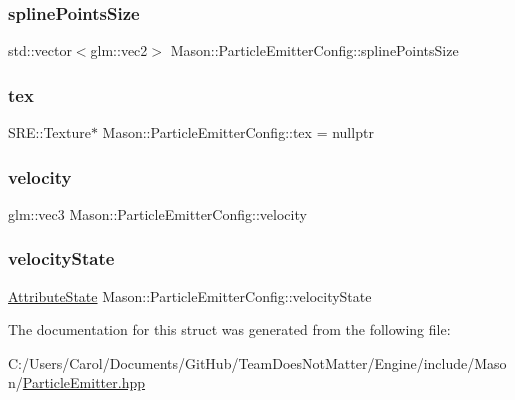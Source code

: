 \subsubsection{\texorpdfstring{spline\+Points\+Size}{splinePointsSize}}
{\footnotesize\ttfamily std\+::vector$<$glm\+::vec2$>$ Mason\+::\+Particle\+Emitter\+Config\+::spline\+Points\+Size}

\hypertarget{struct_mason_1_1_particle_emitter_config_a660e9a7613b158ac36bfc4ffe8b5f610}{}\label{struct_mason_1_1_particle_emitter_config_a660e9a7613b158ac36bfc4ffe8b5f610} 
\subsubsection{\texorpdfstring{tex}{tex}}
{\footnotesize\ttfamily S\+R\+E\+::\+Texture$\ast$ Mason\+::\+Particle\+Emitter\+Config\+::tex = nullptr}

\hypertarget{struct_mason_1_1_particle_emitter_config_af8c3efa305e0a0636576bebe60938c80}{}\label{struct_mason_1_1_particle_emitter_config_af8c3efa305e0a0636576bebe60938c80} 
\subsubsection{\texorpdfstring{velocity}{velocity}}
{\footnotesize\ttfamily glm\+::vec3 Mason\+::\+Particle\+Emitter\+Config\+::velocity}

\hypertarget{struct_mason_1_1_particle_emitter_config_a449a7ec64ad8d9f9be405f1beb5ee507}{}\label{struct_mason_1_1_particle_emitter_config_a449a7ec64ad8d9f9be405f1beb5ee507} 
\subsubsection{\texorpdfstring{velocity\+State}{velocityState}}
{\footnotesize\ttfamily \hyperlink{namespace_mason_aefc2ce7d9295b57af46ab6c8ebfc32f7}{Attribute\+State} Mason\+::\+Particle\+Emitter\+Config\+::velocity\+State}



The documentation for this struct was generated from the following file\+:\begin{DoxyCompactItemize}
\item 
C\+:/\+Users/\+Carol/\+Documents/\+Git\+Hub/\+Team\+Does\+Not\+Matter/\+Engine/include/\+Mason/\hyperlink{_particle_emitter_8hpp}{Particle\+Emitter.\+hpp}\end{DoxyCompactItemize}
